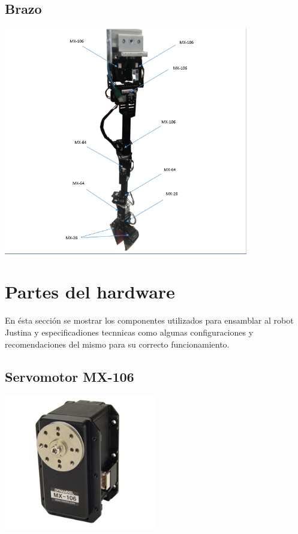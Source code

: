 \documentclass[a4paper]{book}
\begin{document}
\subsection{Brazo}
\begin{center}
\includegraphics[width=0.8\textwidth]{Figures/Hardware/Diagramas/Brazo.png}
\label{fig:Hardware:Diagramas:Imagen:Brazo}
\end{center}

\section{Partes del hardware}
En ésta sección se mostrar los componentes utilizados para ensamblar al robot Justina y especificadiones tecnnicas como algunas configuraciones y recomendaciones del mismo para su correcto funcionamiento.


\subsection{Servomotor MX-106}

\begin{center}
\includegraphics[width=0.5\textwidth]{Figures/Hardware/Partes/MX-106.png}
\label{fig:Hardware:Partes:MX-106}
\end{center}
\end{document}

